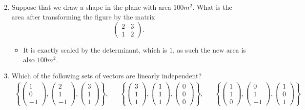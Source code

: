 \documentclass{article}
\begin{document}
\begin{enumerate}
\begin{itemize}
$$		$$
	\end{itemize}
\item Suppose that we draw a shape in the plane with area $100m^2$. What is the area after transforming the figure by the matrix $$ \begin{pmatrix} 2 & 3\\ 1 & 2 \end{pmatrix}. $$
	\begin{itemize}
		\item It is exactly scaled by the determinant, which is $1$, as such the new area is also $100m^2$.
	\end{itemize}
\item Which of the following sets of vectors are linearly independent?
$$
\begin{aligned}
\left\{\begin{pmatrix} 1 \\ 0 \\ -1\end{pmatrix}, \begin{pmatrix} 2 \\ 1 \\ -1 \end{pmatrix}, \begin{pmatrix} 3 \\ 1 \\ 1 \end{pmatrix}\right\},&&\left\{\begin{pmatrix} 3 \\ 1 \\ 1\end{pmatrix}, \begin{pmatrix} 1 \\ 1 \\ 1 \end{pmatrix}, \begin{pmatrix} 0 \\ 0 \\ 0 \end{pmatrix}\right\}, &&\left\{\begin{pmatrix} 1 \\ 1 \\ 0\end{pmatrix}, \begin{pmatrix} 0 \\ 1 \\ -1 \end{pmatrix}, \begin{pmatrix} 1 \\ 0 \\ 1 \end{pmatrix}\right\}

\end{aligned}$$
\end{enumerate}
\end{document}
